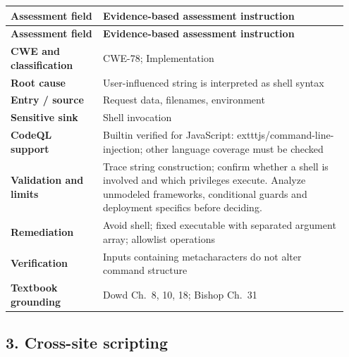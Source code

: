 \documentclass[11pt,letterpaper,oneside]{book}
\begin{document}
\small
\setlength{\tabcolsep}{2pt}
\renewcommand{\arraystretch}{1.18}
\begin{longtable}{>{\raggedright\arraybackslash}p{0.26\linewidth}>{\raggedright\arraybackslash}p{0.69\linewidth}}
\toprule
\textbf{Assessment field} & \textbf{Evidence-based assessment instruction}\\
\midrule
\endfirsthead
\toprule
\textbf{Assessment field} & \textbf{Evidence-based assessment instruction}\\
\midrule
\endhead
\textbf{CWE and classification} & CWE-78; Implementation\\
\textbf{Root cause} & User-influenced string is interpreted as shell syntax\\
\textbf{Entry / source} & Request data, filenames, environment\\
\textbf{Sensitive sink} & Shell invocation\\
\textbf{CodeQL support} & Builtin verified for JavaScript: 	exttt{js/command-line-injection}; other language coverage must be checked\\
\textbf{Validation and limits} & Trace string construction; confirm whether a shell is involved and which privileges execute. Analyze unmodeled frameworks, conditional guards and deployment specifics before deciding.\\
\textbf{Remediation} & Avoid shell; fixed executable with separated argument array; allowlist operations\\
\textbf{Verification} & Inputs containing metacharacters do not alter command structure\\
\textbf{Textbook grounding} & Dowd Ch.~8, 10, 18; Bishop Ch.~31\\
\bottomrule
\end{longtable}
\normalsize

\subsection{3. Cross-site scripting}
\end{document}
